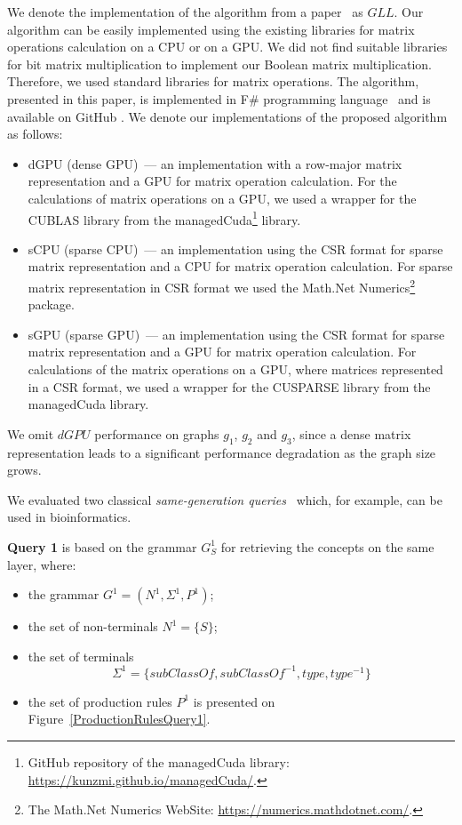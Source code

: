 We denote the implementation of the algorithm from a paper~\cite{GLL} as $GLL$. Our algorithm can be easily implemented using the existing libraries for matrix operations calculation on a CPU or on a GPU. We did not find suitable libraries for bit matrix multiplication to implement our Boolean matrix multiplication. Therefore, we used standard libraries for matrix operations. The algorithm, presented in this paper, is implemented in F\# programming language~\cite{fsharp} and is available on GitHub%
. We denote our implementations of the proposed algorithm as follows:

\begin{itemize}
    \item dGPU (dense GPU)~--- an implementation with a row-major matrix representation and a GPU for matrix operation calculation. For the calculations of matrix operations on a GPU, we used a wrapper for the CUBLAS library from the managedCuda\footnote{GitHub repository of the managedCuda library: \url{https://kunzmi.github.io/managedCuda/}.} library.
    \item sCPU (sparse CPU)~--- an implementation using the CSR format for sparse matrix representation and a CPU for matrix operation calculation. For sparse matrix representation in CSR format we used the Math.Net Numerics\footnote{The Math.Net Numerics WebSite: \url{https://numerics.mathdotnet.com/}.} package.
    \item sGPU (sparse GPU)~--- an implementation using the CSR format for sparse matrix representation and a GPU for matrix operation calculation. For calculations of the matrix operations on a GPU, where matrices represented in a CSR format, we used a wrapper for the CUSPARSE library from the managedCuda library.
\end{itemize}

We omit $dGPU$ performance on graphs $g_1$, $g_2$ and $g_3$, since a dense matrix representation leads to a significant performance degradation as the graph size grows. 

We evaluated two classical \emph{same-generation queries}~\cite{FndDB} which, for example, can be used in bioinformatics.

\textbf{Query 1} is based on the grammar $G^1_S$ for retrieving the concepts on the same layer, where:
\begin{itemize}
    \item the grammar $G^1 = (N^1, \Sigma^1, P^1)$;
    \item the set of non-terminals $N^1 = \{S\}$;
    \item the set of terminals \[\Sigma^1 = \{subClassOf, subClassOf^{-1}, type, type^{-1}\}\]
    \item the set of production rules $P^1$ is presented on Figure~\ref{ProductionRulesQuery1}.
\end{itemize}

